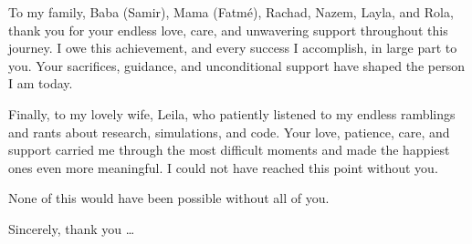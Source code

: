 {To my family, Baba (Samir), Mama (Fatmé), Rachad, Nazem, Layla, and Rola, thank you for your endless love, care, and unwavering support throughout this journey. I owe this achievement, and every success I accomplish, in large part to you. Your sacrifices, guidance, and unconditional support have shaped the person I am today.

Finally, to my lovely wife, Leila, who patiently listened to my endless ramblings and rants about research, simulations, and code. Your love, patience, care, and support carried me through the most difficult moments and made the happiest ones even more meaningful. I could not have reached this point without you.

None of this would have been possible without all of you.  

Sincerely, thank you \ldots
}
